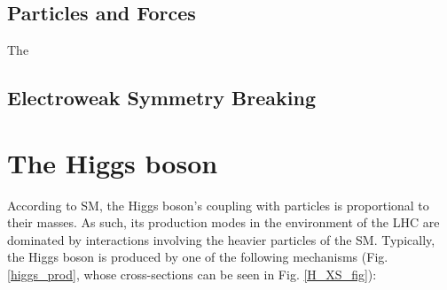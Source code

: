 

\subsection{Particles and Forces}

 The \SM 

\subsection{Electroweak Symmetry Breaking}
\section{The Higgs boson}
According to SM, the Higgs boson's coupling with particles is proportional to their masses. As such, its production modes in the environment of the LHC are dominated by interactions involving the heavier particles of the SM. Typically, the Higgs boson is produced by one of the following mechanisms (Fig. \ref{higgs_prod}, whose cross-sections can be seen in Fig. \ref{H_XS_fig}):

